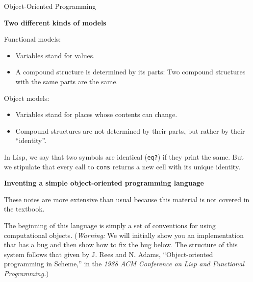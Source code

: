 





\vskip 10pt

\centerline{Object-Oriented Programming}

\medskip

{\bf Two different kinds of models}

Functional models:

\begin{itemize}

\item     Variables stand for values.

\item     A compound structure is determined by its parts: Two compound
structures with the same parts are the same.

\end{itemize}

Object models:

\begin{itemize}

\item    Variables stand for places whose contents can change.

\item     Compound structures are not determined by their parts, but
rather by their ``identity''.

\end{itemize}

In Lisp, we say that two symbols are identical ({\tt eq?}) if they
print the same.  But we stipulate that every call to {\tt cons}
returns a new cell with its unique identity.


\vskip 20pt


{\bf Inventing a simple object-oriented programming language}

These notes are more extensive than usual because this material is not covered in the textbook.

The beginning of this language is simply a set of conventions for using
computational objects.  ({\it Warning:}  We will initially show you an
implementation that has a bug and then show how to fix the bug below.
The structure of this system follows that given by J. Rees and N. Adams,
``Object-oriented programming in Scheme,'' in the {\it 1988 ACM Conference
on Lisp and Functional Programming.})


